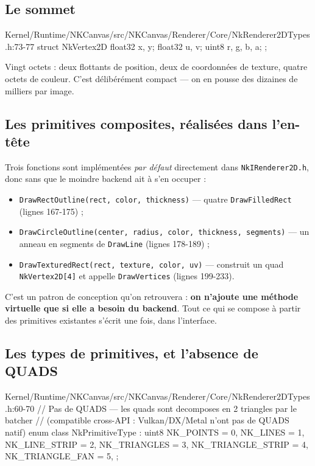 \subsection{Le sommet}

\begin{nkcode}{Kernel/Runtime/NKCanvas/src/NKCanvas/Renderer/Core/NkRenderer2DTypes.h:73-77}
struct NkVertex2D { float32 x, y; float32 u, v; uint8 r, g, b, a; };
\end{nkcode}

Vingt octets : deux flottants de position, deux de coordonnées de texture,
quatre octets de couleur. C'est délibérément compact — on en pousse des dizaines
de milliers par image.

\subsection{Les primitives composites, réalisées dans l'en-tête}

Trois fonctions sont implémentées \emph{par défaut} directement dans
\texttt{NkIRenderer2D.h}, donc sans que le moindre backend ait à s'en occuper :

\begin{itemize}
  \item \texttt{DrawRectOutline(rect, color, thickness)} — quatre
        \texttt{DrawFilledRect} (lignes 167-175) ;
  \item \texttt{DrawCircleOutline(center, radius, color, thickness, segments)} —
        un anneau en segments de \texttt{DrawLine} (lignes 178-189) ;
  \item \texttt{DrawTexturedRect(rect, texture, color, uv)} — construit un quad
        \texttt{NkVertex2D[4]} et appelle \texttt{DrawVertices} (lignes 199-233).
\end{itemize}

C'est un patron de conception qu'on retrouvera : \textbf{on n'ajoute une méthode
virtuelle que si elle a besoin du backend}. Tout ce qui se compose à partir des
primitives existantes s'écrit une fois, dans l'interface.

\subsection{Les types de primitives, et l'absence de QUADS}

\begin{nkcode}{Kernel/Runtime/NKCanvas/src/NKCanvas/Renderer/Core/NkRenderer2DTypes.h:60-70}
// Pas de QUADS — les quads sont decomposes en 2 triangles par le batcher
// (compatible cross-API : Vulkan/DX/Metal n'ont pas de QUADS natif)
enum class NkPrimitiveType : uint8 {
    NK_POINTS = 0, NK_LINES = 1, NK_LINE_STRIP = 2,
    NK_TRIANGLES = 3, NK_TRIANGLE_STRIP = 4, NK_TRIANGLE_FAN = 5,
};
\end{nkcode}

